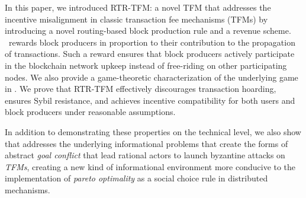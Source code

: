 
In this paper, we introduced \textsc{RTR-TFM}: a novel TFM that addresses the incentive misalignment in classic transaction fee mechanisms (TFMs) by introducing a novel routing-based block production rule and a revenue scheme. \ourTFM\ rewards block producers in proportion to their contribution to the propagation of transactions. Such a reward ensures that block producers actively participate in the blockchain network upkeep instead of free-riding on other participating nodes. We also provide a game-theoretic characterization of the underlying game in \ourTFM. We prove that \textsc{RTR-TFM} effectively discourages transaction hoarding, ensures Sybil resistance, and achieves incentive compatibility for both users and block producers under reasonable assumptions.

In addition to demonstrating these properties on the technical level, we also show that \ourTFM addresses the underlying informational problems that create the forms of abstract \textit{goal conflict} that lead rational actors to launch byzantine attacks on \textit{TFMs}, creating a new kind of informational environment more conducive to the implementation of \textit{pareto optimality} as a social choice rule in distributed mechanisms.

